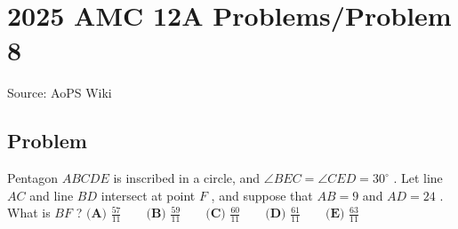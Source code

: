\documentclass[12pt]{article}
\begin{document}
\section*{{2025 AMC 12A Problems/Problem 8}}
Source: AoPS Wiki

\subsection*{Problem}
Pentagon $ABCDE$ is inscribed in a circle, and $\angle BEC = \angle CED = 30^\circ$ . Let line $AC$ and line $BD$ intersect at point $F$ , and suppose that $AB = 9$ and $AD = 24$ . What is $BF$ ? $\textbf{(A) } \frac{57}{11} \qquad\textbf{(B) } \frac{59}{11} \qquad\textbf{(C) } \frac{60}{11} \qquad\textbf{(D) } \frac{61}{11} \qquad\textbf{(E) } \frac{63}{11}$
\end{document}
